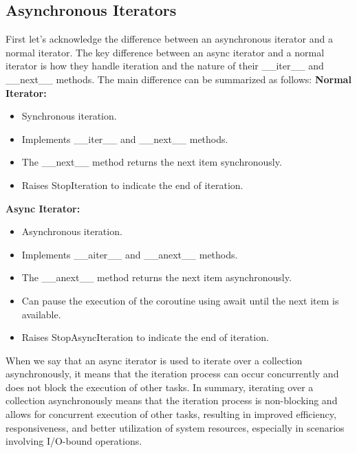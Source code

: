 \documentclass{report}
\begin{document}
    \pagebreak \bigbreak \noindent
    \subsection{Asynchronous Iterators}
    \bigbreak \noindent 
    First let's acknowledge the difference between an asynchronous iterator and a normal iterator.
    \bigbreak \noindent 
    The key difference between an async iterator and a normal iterator is how they handle iteration and the nature of their \_\_iter\_\_ and \_\_next\_\_ methods.
    \bigbreak \noindent 
    The main difference can be summarized as follows:
    \bigbreak \noindent 
    \textbf{Normal Iterator:}
    \begin{itemize}
        \item Synchronous iteration.
        \item Implements \_\_iter\_\_ and \_\_next\_\_ methods.
        \item The \_\_next\_\_ method returns the next item synchronously.
        \item Raises StopIteration to indicate the end of iteration.
    \end{itemize}
    \textbf{Async Iterator:}
    \begin{itemize}
        \item Asynchronous iteration.
        \item Implements \_\_aiter\_\_ and \_\_anext\_\_ methods.
        \item The \_\_anext\_\_ method returns the next item asynchronously.
        \item Can pause the execution of the coroutine using await until the next item is available.
        \item Raises StopAsyncIteration to indicate the end of iteration.
    \end{itemize}
    \bigbreak \noindent 
    When we say that an async iterator is used to iterate over a collection asynchronously, it means that the iteration process can occur concurrently and does not block the execution of other tasks.
    \bigbreak \noindent 
    In summary, iterating over a collection asynchronously means that the iteration process is non-blocking and allows for concurrent execution of other tasks, resulting in improved efficiency, responsiveness, and better utilization of system resources, especially in scenarios involving I/O-bound operations.
    \pagebreak \bigbreak \noindent
\end{document}
